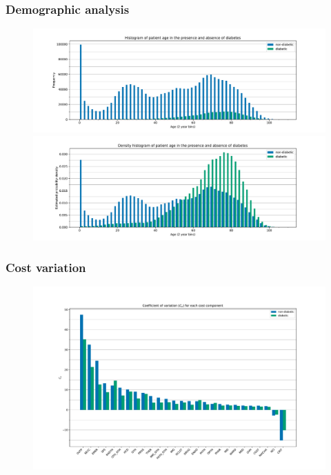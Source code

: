 \documentclass{beamer}
\begin{document}
\begin{frame}
    \frametitle{Demographic analysis}

    \begin{figure}
        \begin{minipage}{\linewidth}
            \includegraphics[width=\linewidth]{./img/diabetic_age_freq_hist.pdf}
        \end{minipage}
        \begin{minipage}{\linewidth}
            \includegraphics[width=\linewidth]
                {./img/diabetic_age_density_hist.pdf}
        \end{minipage}
    \end{figure}
\end{frame}

\begin{frame}
    \frametitle{Cost variation}

    \begin{figure}
        \includegraphics[width=\linewidth]{./img/diabetic_coeff_variation.pdf}
    \end{figure}
\end{frame}
\end{document}
